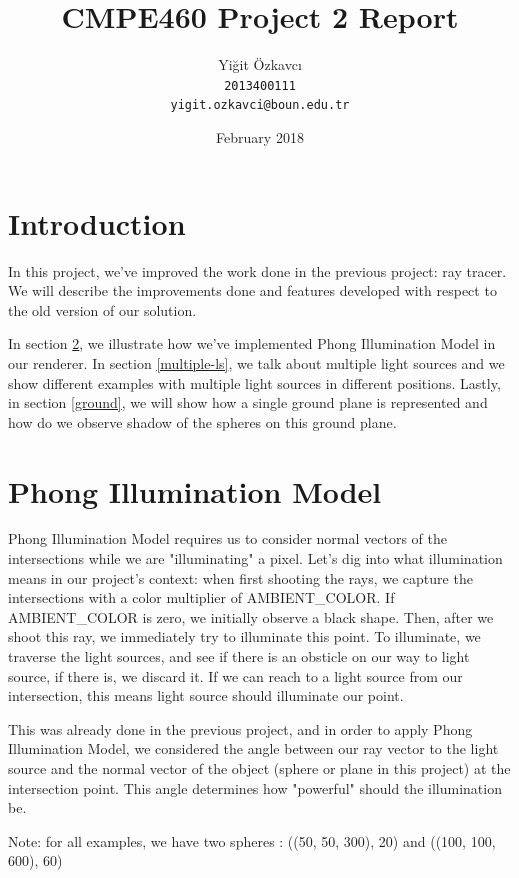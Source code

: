 \documentclass{article}
\title{CMPE460 Project 2 Report}
\author{
  Yiğit Özkavcı \\
  \texttt{2013400111} \\
  \texttt{yigit.ozkavci@boun.edu.tr}
}
\date{February 2018}
\begin{document}
\maketitle

\tableofcontents

\section{Introduction}

In this project, we've improved the work done in the previous project: ray tracer. We will describe the improvements done and features developed with respect to the old version of our solution.

In section \ref{phong}, we illustrate how we've implemented Phong Illumination Model in our renderer. In section \ref{multiple-ls}, we talk about multiple light sources and we show different examples with multiple light sources in different positions. Lastly, in section \ref{ground}, we will show how a single ground plane is represented and how do we observe shadow of the spheres on this ground plane.

\newpage

\section{Phong Illumination Model}
\label{phong}

Phong Illumination Model requires us to consider normal vectors of the intersections while we are "illuminating" a pixel. Let's dig into what illumination means in our project's context: when first shooting the rays, we capture the intersections with a color multiplier of AMBIENT\_COLOR. If AMBIENT\_COLOR is zero, we initially observe a black shape. Then, after we shoot this ray, we immediately try to illuminate this point. To illuminate, we traverse the light sources, and see if there is an obsticle on our way to light source, if there is, we discard it. If we can reach to a light source from our intersection, this means light source should illuminate our point.

This was already done in the previous project, and in order to apply Phong Illumination Model, we considered the angle between our ray vector to the light source and the normal vector of the object (sphere or plane in this project) at the intersection point. This angle determines how "powerful" should the illumination be.

Note: for all examples, we have two spheres : ((50, 50, 300), 20) and ((100, 100, 600), 60)
\end{document}
